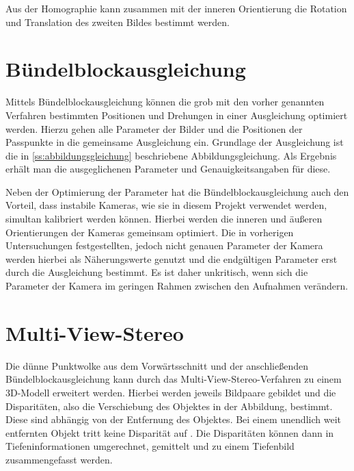 \documentclass[./00PhotoBox.tex]{subfiles}
\begin{document}
Aus der Homographie kann zusammen mit der inneren Orientierung die Rotation und Translation des zweiten Bildes bestimmt werden.
\citep[S. 74]{homography_decomposition}

\section{Bündelblockausgleichung}
\label{s:buendelblock}
Mittels Bündelblockausgleichung können die grob mit den vorher genannten Verfahren bestimmten Positionen und Drehungen in einer Ausgleichung optimiert werden. Hierzu gehen alle Parameter der Bilder und die Positionen der Passpunkte in die gemeinsame Ausgleichung ein. Grundlage der Ausgleichung ist die in \autoref{ss:abbildungsgleichung} beschriebene Abbildungsgleichung. Als Ergebnis erhält man die ausgeglichenen Parameter und Genauigkeitsangaben für diese. \citep[S. 343ff]{luhmann}

Neben der Optimierung der Parameter hat die Bündelblockausgleichung auch den Vorteil, dass instabile Kameras, wie sie in diesem Projekt verwendet werden, simultan kalibriert werden können. Hierbei werden die inneren und äußeren Orientierungen der Kameras gemeinsam optimiert. Die in vorherigen Untersuchungen festgestellten, jedoch nicht genauen Parameter der Kamera werden hierbei als Näherungswerte genutzt und die endgültigen Parameter erst durch die Ausgleichung bestimmt. Es ist daher unkritisch, wenn sich die Parameter der Kamera im geringen Rahmen zwischen den Aufnahmen verändern. \citep[S. 357f]{luhmann}


\section{Multi-View-Stereo}
Die dünne Punktwolke aus dem Vorwärtsschnitt und der anschließenden Bündel\-block\-ausgleichung kann durch das Multi-View-Stereo-Verfahren zu einem 3D-Modell erweitert werden. Hierbei werden jeweils Bildpaare gebildet und die Disparitäten, also die Verschiebung des Objektes in der Abbildung, bestimmt. Diese sind abhängig von der Entfernung des Objektes. Bei einem unendlich weit entfernten Objekt tritt keine Disparität auf \citep[S. 313]{luhmann}. Die Disparitäten können dann in Tiefeninformationen umgerechnet, gemittelt und zu einem Tiefenbild zusammengefasst werden. \citep[S. 505]{luhmann}
\end{document}
